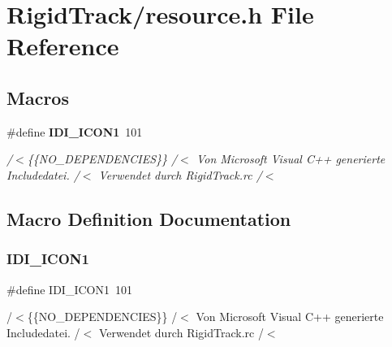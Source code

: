 \section{Rigid\+Track/resource.h File Reference}
\label{resource_8h}
\subsection*{Macros}
\begin{DoxyCompactItemize}
\item 
\#define \textbf{ I\+D\+I\+\_\+\+I\+C\+O\+N1}~101
\begin{DoxyCompactList}\small\item\em /$<$\{\{N\+O\+\_\+\+D\+E\+P\+E\+N\+D\+E\+N\+C\+I\+ES\}\} /$<$ Von Microsoft Visual C++ generierte Includedatei. /$<$ Verwendet durch Rigid\+Track.\+rc /$<$ \end{DoxyCompactList}\end{DoxyCompactItemize}


\subsection{Macro Definition Documentation}
\mbox{\label{resource_8h_a455fef2a9349aae3af8ef8f24f6fc9d8}} 
\subsubsection{I\+D\+I\+\_\+\+I\+C\+O\+N1}
{\footnotesize\ttfamily \#define I\+D\+I\+\_\+\+I\+C\+O\+N1~101}



/$<$\{\{N\+O\+\_\+\+D\+E\+P\+E\+N\+D\+E\+N\+C\+I\+ES\}\} /$<$ Von Microsoft Visual C++ generierte Includedatei. /$<$ Verwendet durch Rigid\+Track.\+rc /$<$ 

